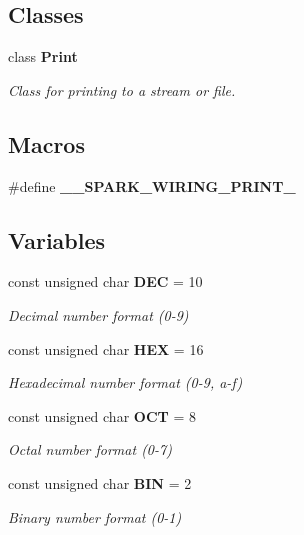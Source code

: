 \subsection*{Classes}
\begin{DoxyCompactItemize}
\item 
class \textbf{ Print}
\begin{DoxyCompactList}\small\item\em Class for printing to a stream or file. \end{DoxyCompactList}\end{DoxyCompactItemize}
\subsection*{Macros}
\begin{DoxyCompactItemize}
\item 
\#define \textbf{ \+\_\+\+\_\+\+S\+P\+A\+R\+K\+\_\+\+W\+I\+R\+I\+N\+G\+\_\+\+P\+R\+I\+N\+T\+\_\+}
\end{DoxyCompactItemize}
\subsection*{Variables}
\begin{DoxyCompactItemize}
\item 
const unsigned char \textbf{ D\+EC} = 10
\begin{DoxyCompactList}\small\item\em Decimal number format (0-\/9) \end{DoxyCompactList}\item 
const unsigned char \textbf{ H\+EX} = 16
\begin{DoxyCompactList}\small\item\em Hexadecimal number format (0-\/9, a-\/f) \end{DoxyCompactList}\item 
const unsigned char \textbf{ O\+CT} = 8
\begin{DoxyCompactList}\small\item\em Octal number format (0-\/7) \end{DoxyCompactList}\item 
const unsigned char \textbf{ B\+IN} = 2
\begin{DoxyCompactList}\small\item\em Binary number format (0-\/1) \end{DoxyCompactList}\end{DoxyCompactItemize}


